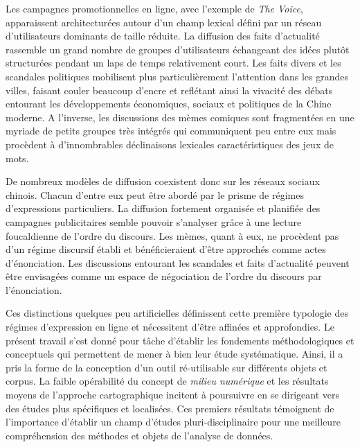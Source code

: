 Les campagnes promotionnelles en ligne, avec l’exemple de \textit{The Voice}, apparaissent architecturées autour d'un champ lexical défini par un réseau d'utilisateurs dominants de taille réduite. La diffusion des faits d'actualité rassemble un grand nombre de groupes d'utilisateurs échangeant des idées plutôt structurées pendant un laps de temps relativement court. Les faits divers et les scandales politiques mobilisent plus particulièrement l'attention dans les grandes villes, faisant couler beaucoup d'encre et reflétant ainsi la vivacité des débats entourant les développements économiques, sociaux et politiques de la Chine moderne. A l’inverse, les discussions des mèmes comiques sont fragmentées en une myriade de petits groupes très intégrés qui communiquent peu entre eux mais procèdent à d'innombrables déclinaisons lexicales caractéristiques des jeux de mots.

De nombreux modèles de diffusion coexistent donc sur les réseaux sociaux chinois. Chacun d'entre eux peut être abordé par le prisme de régimes d'expressions particuliers. La diffusion fortement organisée et planifiée des campagnes publicitaires semble pouvoir s'analyser grâce à une lecture foucaldienne de l'ordre du discours. Les mèmes, quant à eux,  ne procèdent pas d'un régime discursif établi et bénéficieraient d'être approchés comme actes d'énonciation. Les discussions entourant les scandales et faits d'actualité peuvent être envisagées comme un espace de négociation de l'ordre du discours par l'énonciation.

Ces distinctions quelques peu artificielles définissent cette première typologie des régimes d'expression en ligne et nécessitent d'être affinées et approfondies. Le présent travail s'est donné pour tâche d'établir les fondements méthodologiques et conceptuels qui permettent de mener à bien leur étude systématique. Ainsi, il a pris la forme de la conception d'un outil ré-utilisable sur différents objets et corpus. La faible opérabilité du concept de \textit{milieu numérique} et les résultats moyens de l'approche cartographique incitent à poursuivre en se dirigeant vers des études plus spécifiques et localisées. Ces premiers résultats témoignent de l'importance d'établir un champ d'études pluri-disciplinaire pour une meilleure compréhension des méthodes et objets de l'analyse de données. 



